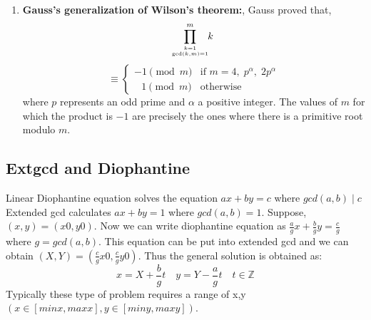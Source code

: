 \begin{enumerate}[resume]
\[          \]
          Here, $d(x) =$ number of divisors of $\displaystyle x$.
    \item \textbf{Gauss’s generalization of Wilson’s theorem:},
          Gauss proved that,
          \[\displaystyle \prod \limits_{k=1 \atop \gcd(k,m)=1}^{m}\!\!k\ \]
          \[\displaystyle \equiv {\begin{cases}-1{\pmod {m}}&{\text{if }}m=4,\;p^{\alpha },\;2p^{\alpha }\\\;\;\,1{\pmod {m}}&{\text{otherwise}}\end{cases}}\]
          where $\displaystyle p$ represents an odd prime and $\displaystyle \alpha$ a positive integer. The values of $m$ for which the product is $-1$ are precisely the ones where there is a primitive root modulo $m$.
\end{enumerate}

\subsection{Extgcd and Diophantine}
Linear Diophantine equation solves the equation $ax+by=c$ where $gcd(a,b) \mid c$
Extended gcd calculates $ax+by=1$ where $gcd(a,b) = 1$. Suppose, $(x,y) = (x0,y0)$.
Now we can write diophantine equation as $\frac{a}{g}x + \frac{b}{g}y = \frac{c}{g}$ where $g=gcd(a,b)$. This equation can be
put into extended gcd and we can obtain $(X,Y) = (\frac{c}{g}x0, \frac{c}{g}y0)$. Thus the general solution is obtained as:
$$x = X+\frac{b}{g}t \quad y = Y-\frac{a}{g}t \quad t \in \mathbb{Z}$$
Typically these type of problem requires a range of x,y $(x \in [minx, maxx], y \in [miny,maxy])$.

